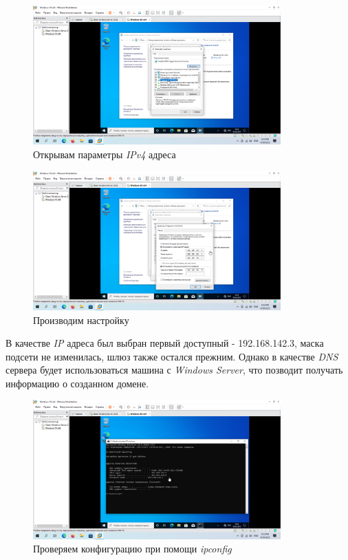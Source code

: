 \documentclass[a4paper]{article}
\begin{document}
  \begin{figure}[H]
    \centering
    \includegraphics[width=0.85\textwidth]{Screenshot_88}
    \caption{Открывам параметры \textit{IPv4} адреса}
    \label{img:88}
  \end{figure}

  \begin{figure}[H]
    \centering
    \includegraphics[width=0.85\textwidth]{Screenshot_89}
    \caption{Производим настройку}
    \label{img:89}
  \end{figure}

  В качестве \textit{IP} адреса был выбран первый доступный - 192.168.142.3, маска
  подсети не изменилась, шлюз также остался прежним.
  Однако в качестве \textit{DNS} сервера будет использоваться машина с \textit{Windows Server},
  что позводит получать информацию о созданном домене.

  \begin{figure}[H]
    \centering
    \includegraphics[width=0.85\textwidth]{Screenshot_90}
    \caption{Проверяем конфигурацию при помощи \textit{ipconfig}}
    \label{img:90}
  \end{figure}
\end{document}
